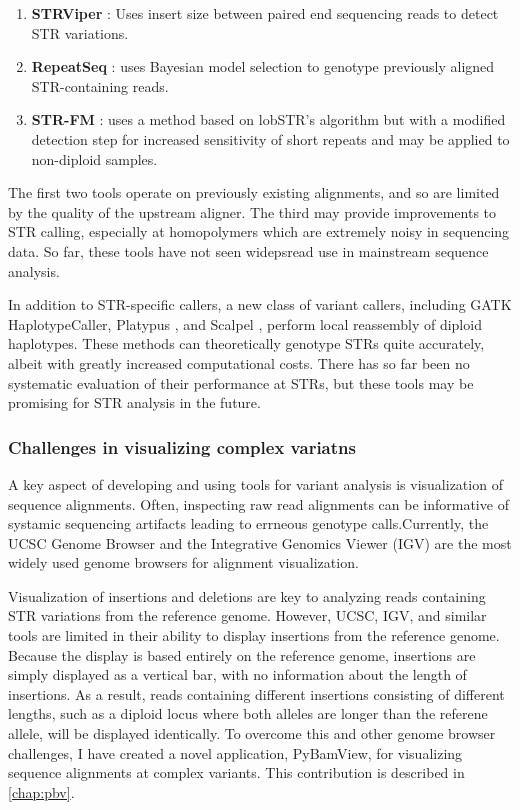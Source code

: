 \begin{enumerate}
\item \textbf{STRViper} \cite{CaoTaskerWilladsenEtAl2014}: Uses insert size between paired end sequencing reads to detect STR variations.
\item \textbf{RepeatSeq} \cite{HighnamFranckMartinEtAl2013}: uses Bayesian model selection to genotype previously aligned STR-containing reads.
\item \textbf{STR-FM} \cite{FungtammasanAnandaHileEtAl2015}: uses a method based on lobSTR's algorithm but with a modified detection step for increased sensitivity of short repeats and may be applied to non-diploid samples.
\end{enumerate}

The first two tools operate on previously existing alignments, and so are limited by the quality of the upstream aligner. The third may provide improvements to STR calling, especially at homopolymers which are extremely noisy in sequencing data. So far, these tools have not seen widepsread use in mainstream sequence analysis.

In addition to STR-specific callers, a new class of variant callers, including GATK \cite{McKennaHannaBanksEtAl2010} HaplotypeCaller, Platypus \cite{RimmerPhanMathiesonEtAl2014}, and Scalpel \cite{NarzisiOextquotesingleRaweIossifovEtAl2014}, perform local reassembly of diploid haplotypes. These methods can theoretically genotype STRs quite accurately, albeit with greatly increased computational costs. There has so far been no systematic evaluation of their performance at STRs, but these tools may be promising for STR analysis in the future.

\subsubsection{Challenges in visualizing complex variatns}
A key aspect of developing and using tools for variant analysis is visualization of sequence alignments. Often, inspecting raw read alignments can be informative of systamic sequencing artifacts leading to errneous genotype calls.Currently, the UCSC Genome Browser \cite{KentSugnetFureyEtAl2002} and the Integrative Genomics Viewer (IGV) \cite{RobinsonThorvaldsdottirWincklerEtAl2011} are the most widely used genome browsers for alignment visualization.

Visualization of insertions and deletions are key to analyzing reads containing STR variations from the reference genome. However, UCSC, IGV, and similar tools are limited in their ability to display insertions from the reference genome. Because the display is based entirely on the reference genome, insertions are simply displayed as a vertical bar, with no information about the length of insertions. As a result, reads containing different insertions consisting of different lengths, such as a diploid locus where both alleles are longer than the referene allele, will be displayed identically. To overcome this and other genome browser challenges, I have created a novel application, PyBamView, for visualizing sequence alignments at complex variants. This contribution is described in \autoref{chap:pbv}.

